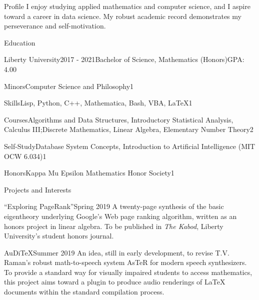 \documentclass{resume-classica}
\begin{document}
\printheader
\begin{rSection}{Profile}
    I enjoy studying applied mathematics and computer science, and I aspire toward a career in data science. My robust academic record demonstrates my perseverance and self-motivation.
\end{rSection}

\begin{rSection}{Education}
    \begin{rSubsectionList}{Liberty University}{2017 - 2021}{Bachelor of Science, Mathematics (Honors)}{GPA: 4.00}
        \begin{rLabeledList}{\scshape}
            \item{Minors}{Computer Science and Philosophy}{1}
            \item{Skills}{Lisp, Python, C++, Mathematica, Bash, VBA, \LaTeX{}}{1}
            \item{Courses}{Algorithms and Data Structures, Introductory Statistical Analysis, Calculus III;\newline Discrete Mathematics, Linear Algebra, Elementary Number Theory}{2}
            \item{Self-Study}{Database System Concepts, Introduction to Artificial Intelligence (MIT OCW 6.034)}{1}
            \item{Honors}{Kappa Mu Epsilon Mathematics Honor Society\vspace{2mm}}{1}
        \end{rLabeledList}
    \end{rSubsectionList}
\end{rSection}

\begin{rSection}{Projects and Interests}
    \begin{rSubsectionList}{``Exploring PageRank''}{Spring 2019}{}{}
        A twenty-page synthesis of the basic eigentheory underlying Google's Web page ranking algorithm, written as an honors project in linear algebra. To be published in \textit{The Kabod}, Liberty University's student honors journal.
    \end{rSubsectionList}

    \begin{rSubsectionParagraph}{AuDiTeX}{Summer 2019}{}{}
        An idea, still in early development, to revise T.V. Raman's robust math-to-speech system AsTeR for modern speech synthesizers. To provide a standard way for visually impaired students to access mathematics, this project aims toward a plugin to produce audio renderings of \LaTeX{} documents within the standard compilation process.
    \end{rSubsectionParagraph}
\end{rSection}
\end{document}
